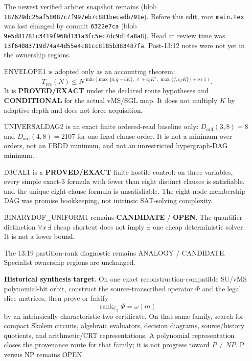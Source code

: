 \documentclass[11pt]{article}
\begin{document}
The newest verified arbiter snapshot remains
(blob \texttt{187629dc25af58087c7f997eb7c881becadb791e}).
Before this edit, root \texttt{main.tex} was last changed by commit \texttt{6322e7ca}
(blob \texttt{9e5d81781c3419f968d131a3fc5ec7dc9d14a8a8}). Head at review time was
\texttt{13f64083719d74a44d55e4c81cc8185b383487fa}. Post-13:12 notes were not yet in the
ownership regions.

ENVELOPE1 is adopted only as an accounting theorem:
\[
T_{\mathrm{rec}}(N)\le N^{\min\{\max\{a,q+bK\},\,\ell+c_0 K^2,\,\max\{f,c_F K\}\}+o(1)}.
\]
It is \textbf{PROVED/EXACT} under the declared route hypotheses and \textbf{CONDITIONAL} for the
actual vMS/SGL map. It does not multiply \(K\) by adaptive depth and does not force acquisition.

UNIVERSALDAG2 is an exact finite ordered-read baseline only: \(D_{\mathrm{ord}}(3,8)=8\) and
\(D_{\mathrm{ord}}(4,8)=2107\) for one fixed clause order. It is not a minimum over orders, not an
FBDD minimum, and not an unrestricted hypergraph-DAG minimum.

D3CAL1 is a \textbf{PROVED/EXACT} finite hostile control: on three variables, every simple exact-3
formula with fewer than eight distinct clauses is satisfiable, and the unique eight-clause formula
is unsatisfiable. The eight-node membership DAG was promise bookkeeping, not intrinsic SAT-solving
complexity.

BINARYDOF\_UNIFORM1 remains \textbf{CANDIDATE} / \textbf{OPEN}. The quantifier distinction
\(\forall x\,\exists\) cheap shortcut does not imply \(\exists\) one cheap deterministic solver.
It is not a lower bound.

The 13:19 partition-rank diagnostic remains ANALOGY / CANDIDATE. Specialist ownership regions are
unchanged.

\begin{candidatebox}
\textbf{Historical synthesis target.}
On one exact reconstruction-compatible SU/vMS polynomial-bit orbit, construct the
source-transcribed operator \(\Phi\) and the legal slice matrices, then prove or falsify
\[
\operatorname{rank}_{\mathbb F_2}\Phi=\omega(m)
\]
by an intrinsically characteristic-two certificate. On that same family, search for compact
Skolem circuits, algebraic evaluators, decision diagrams, source/history quotients, and
arithmetic/CRT representations. A polynomial representation closes the provenance route for
that family; it is not progress toward \(P\neq NP\). P versus NP remains OPEN.
\end{candidatebox}
\end{document}
